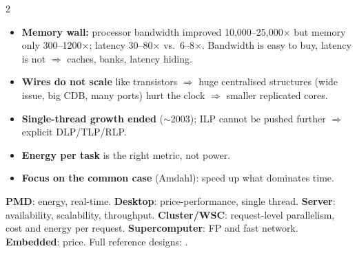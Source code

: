 \begin{multicols}{2}

\columnbreak
\begin{key}
\begin{itemize}
\item \textbf{Memory wall:} processor bandwidth improved 10{,}000--25{,}000$\times$ but memory only 300--1200$\times$; latency 30--80$\times$ vs.\ 6--8$\times$. Bandwidth is easy to buy, latency is not $\Rightarrow$ caches, banks, latency hiding.
\item \textbf{Wires do not scale} like transistors $\Rightarrow$ huge centralised structures (wide issue, big CDB, many ports) hurt the clock $\Rightarrow$ smaller replicated cores.
\item \textbf{Single-thread growth ended} ($\sim$2003); ILP cannot be pushed further $\Rightarrow$ explicit DLP/TLP/RLP.
\item \textbf{Energy per task} is the right metric, not power.
\item \textbf{Focus on the common case} (Amdahl): speed up what dominates time.
\end{itemize}
\end{key}

\begin{key}
\textbf{PMD}: energy, real-time. \textbf{Desktop}: price-performance, single thread. \textbf{Server}: availability, scalability, throughput. \textbf{Cluster/WSC}: request-level parallelism, cost and energy per request. \textbf{Supercomputer}: FP and fast network. \textbf{Embedded}: price. Full reference designs: .
\end{key}
\end{multicols}
